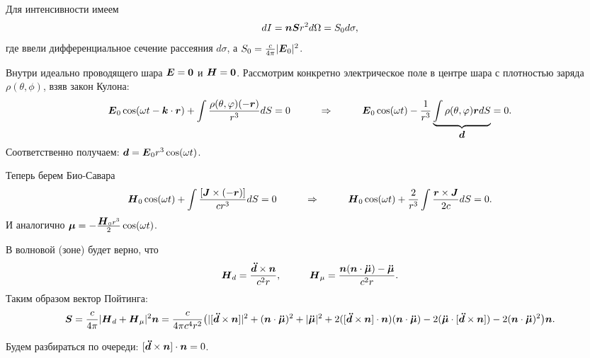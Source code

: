 Для интенсивности имеем
\begin{equation*}
	d I = \mbox{\boldmath $n$} \mbox{\boldmath $S$} r^2 d \Omega = S_0 d \sigma,
\end{equation*}
где ввели дифференциальное сечение рассеяния $d \sigma$, а $S_0 = \frac{c}{4 \pi} |\mbox{\boldmath $E$}_0|^2$.

Внутри идеально проводящего шара $\mbox{\boldmath $E$} = \mbox{\boldmath $0$}$ и $\mbox{\boldmath $H$} = \mbox{\boldmath $0$}$.
Рассмотрим конкретно электрическое поле в центре шара с плотностью заряда $\rho(\theta,\phi)$, взяв закон Кулона:
\begin{equation*}
	\mbox{\boldmath $E$}_0 \cos (\omega t - \mbox{\boldmath $k$} \cdot \mbox{\boldmath $r$}) + \int \frac{\rho (\theta,\varphi) (-  \mbox{\boldmath $r$})}{r^3}d S = 0
	\hspace{1 cm}
	\Rightarrow
	\hspace{1 cm}
	\mbox{\boldmath $E$}_0 \cos (\omega t) - \frac{1}{r^3} \underbrace{\int \rho(\theta,\varphi) \mbox{\boldmath $r$} d S}_{\mbox{\boldmath $d$}} = 0.
\end{equation*}
Соответственно получаем: $\mbox{\boldmath $d$} = \mbox{\boldmath $E$}_0 r^3 \cos (\omega t)$.

Теперь берем Био-Савара
\begin{equation*}
	\mbox{\boldmath $H$}_0 \cos (\omega t) + \int \frac{[\mbox{\boldmath $J$} \times (- \mbox{\boldmath $r$})]}{c r^3} dS = 0
	\hspace{1 cm}
	\Rightarrow
	\hspace{1 cm}
	\mbox{\boldmath $H$}_0 \cos (\omega t) + \frac{2}{r^3} \int \frac{\mbox{\boldmath $r$} \times \mbox{\boldmath $J$}}{2 c} d S = 0.
\end{equation*}
И аналогично $\mbox{\boldmath $\mu$} = - \frac{\mbox{\boldmath $H$}_0 r^3}{2} \cos (\omega t)$.

В волновой (зоне) будет верно, что
\begin{equation*}
	\mbox{\boldmath $H$}_d = \frac{\mbox{\boldmath $\ddot{d}$} \times \mbox{\boldmath $n$}}{c^2 r},
	\hspace{1 cm}
	\mbox{\boldmath $H$}_\mu = \frac{\mbox{\boldmath $n$} (\mbox{\boldmath $n$} \cdot \mbox{\boldmath $\ddot{\mu}$}) - \mbox{\boldmath $\ddot{\mu}$}}{c^2 r}.
\end{equation*}
Таким образом вектор Пойтинга:
\begin{equation*}
	\mbox{\boldmath $S$} = \frac{c}{4 \pi} |\mbox{\boldmath $H$}_d + \mbox{\boldmath $H$}_\mu|^2 \mbox{\boldmath $n$}
	=
	\frac{c}{4 \pi c^4 r^2} \big( |[\mbox{\boldmath $\ddot{d}$} \times \mbox{\boldmath $n$}]|^2 + (\mbox{\boldmath $n$} \cdot \mbox{\boldmath $\ddot{\mu}$})^2 + |\mbox{\boldmath $\ddot{\mu}$}|^2 + 2 ([\mbox{\boldmath $\ddot{d}$} \times \mbox{\boldmath $n$}] \cdot \mbox{\boldmath $n$}) (\mbox{\boldmath $n$} \cdot \mbox{\boldmath $\ddot{\mu}$}) - 2 (\mbox{\boldmath $\ddot{\mu}$} \cdot [\mbox{\boldmath $\ddot{d}$} \times \mbox{\boldmath $n$}]) - 2 (\mbox{\boldmath $n$} \cdot \mbox{\boldmath $\ddot{\mu}$})^2 \big) \mbox{\boldmath $n$}.
\end{equation*}

Будем разбираться по очереди: $[\mbox{\boldmath $\ddot{d}$} \times \mbox{\boldmath $n$}] \cdot \mbox{\boldmath $n$} = 0$.

